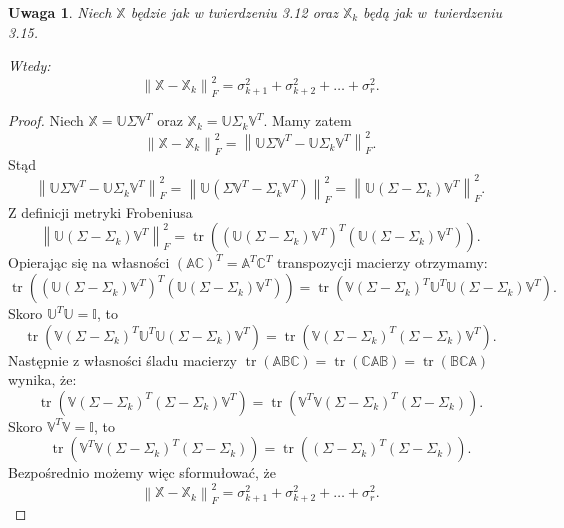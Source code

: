 \documentclass[12pt,a4paper]{report}
\newtheorem{uwaga}[df]{Uwaga}
\newcommand{\norma}[1]{\left\| {#1} \right\|}
\newcommand{\tr}[1]{\operatorname{tr}\left({#1} \right)}
\begin{document}
\begin{uwaga}
Niech $\mathbb{X}$ będzie jak w twierdzeniu 3.12 oraz $\mathbb{X}_k$ będą jak w~twierdzeniu 3.15.

Wtedy:
$$
\norma{ \mathbb{X} - \mathbb{X}_k}_F^2 = \sigma_{k+1}^2 + \sigma_{k+2}^2 + \ldots + \sigma_{r}^2.
$$
\end{uwaga}
\begin{proof}
Niech $\mathbb{X}=\mathbb{U} \Sigma \mathbb{V}^T$ oraz $\mathbb{X}_k=\mathbb{U} \Sigma_k \mathbb{V}^T$.
Mamy zatem
$$
\norma{ \mathbb{X} - \mathbb{X}_k}_F^2 =
\norma{\mathbb{U} \Sigma \mathbb{V}^T - \mathbb{U} \Sigma_k \mathbb{V}^T}_F^2.
$$
Stąd
$$
\norma{\mathbb{U} \Sigma \mathbb{V}^T - \mathbb{U} \Sigma_k \mathbb{V}^T}_F^2 = 
\norma{\mathbb{U} (\Sigma \mathbb{V}^T - \Sigma_k \mathbb{V}^T)}_F^2 = 
\norma{\mathbb{U} (\Sigma - \Sigma_k) \mathbb{V}^T}_F^2.
$$
Z definicji metryki Frobeniusa
$$
\norma{\mathbb{U} (\Sigma - \Sigma_k) \mathbb{V}^T}_F^2 = 
\tr{(\mathbb{U} (\Sigma - \Sigma_k) \mathbb{V}^T)^T (\mathbb{U} (\Sigma - \Sigma_k) \mathbb{V}^T)}.
$$
Opierając się na własności $(\mathbb{A}\mathbb{C})^T = \mathbb{A}^T \mathbb{C}^T$ transpozycji macierzy otrzymamy:
$$
\tr{(\mathbb{U} (\Sigma - \Sigma_k) \mathbb{V}^T)^T (\mathbb{U} (\Sigma - \Sigma_k) \mathbb{V}^T)} = \tr{\mathbb{V} (\Sigma - \Sigma_k)^T \mathbb{U}^T \mathbb{U} (\Sigma - \Sigma_k) \mathbb{V}^T}.
$$
Skoro $\mathbb{U}^T \mathbb{U} = \mathbb{I}$, to
$$
\tr{\mathbb{V} (\Sigma - \Sigma_k)^T \mathbb{U}^T \mathbb{U} (\Sigma - \Sigma_k) \mathbb{V}^T} = 
\tr{\mathbb{V} (\Sigma - \Sigma_k)^T (\Sigma - \Sigma_k) \mathbb{V}^T}.
$$
Następnie z własności śladu macierzy $\tr{\mathbb{A} \mathbb{B} \mathbb{C}}  = \tr{\mathbb{C} \mathbb{A} \mathbb{B}} = \tr{\mathbb{B} \mathbb{C} \mathbb{A}}$ wynika, że:
$$
\tr{\mathbb{V} (\Sigma - \Sigma_k)^T (\Sigma - \Sigma_k) \mathbb{V}^T} = \tr{\mathbb{V}^T \mathbb{V} (\Sigma - \Sigma_k)^T (\Sigma - \Sigma_k)}.
$$ 
Skoro $\mathbb{V}^T \mathbb{V} = \mathbb{I}$, to
$$
\tr{\mathbb{V}^T \mathbb{V} (\Sigma - \Sigma_k)^T (\Sigma - \Sigma_k)} = \tr{(\Sigma - \Sigma_k)^T (\Sigma - \Sigma_k) }.
$$
Bezpośrednio możemy więc sformułować, że
$$
\norma{ \mathbb{X} - \mathbb{X}_k}_F^2 = \sigma_{k+1}^2 + \sigma_{k+2}^2 + \ldots + \sigma_{r}^2.
$$
\end{proof}
\end{document}
